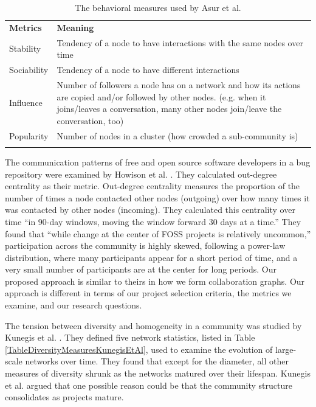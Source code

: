 \documentclass{acm_proc_article-sp}
\begin{document}
\begin{table}[!htbp]
\caption{The behavioral measures used by Asur et al. \cite{Asur}}
\label{tableDiversityMeasuresAsurEtAl} 
\begin{tabular}{p{} p{}}
\hline\noalign{\smallskip}
\textbf{Metrics} & \textbf{Meaning} \\
\noalign{\smallskip}\hline\noalign{\smallskip}
Stability & Tendency of a node to have interactions with the same nodes over time \\ \hline
Sociability & Tendency of a node to have different interactions \\\hline
Influence & Number of followers a node has on a network and how its actions are copied and/or followed by other nodes. (e.g. when it joins/leaves a conversation, many other nodes join/leave the conversation, too) \\\hline
Popularity & Number of nodes in a cluster (how crowded a sub-community is) \\
\noalign{\smallskip}\hline
\end{tabular}
\end{table}

The communication patterns of free and open source software developers in a bug repository were examined by Howison et al. \cite{HowisonSocialDynamics}. They calculated out-degree centrality as their metric. Out-degree centrality measures the proportion of the number of times a node contacted other nodes (outgoing) over how many times it was contacted by other nodes (incoming). They calculated this centrality over time ``in 90-day windows, moving the window forward 30 days at a time.'' They found that ``while change at the center of FOSS projects is relatively uncommon,'' participation across the community is highly skewed, following a power-law distribution, where many participants appear for a short period of time, and a very small number of participants are at the center for long periods. Our proposed approach is similar to theirs in how we form collaboration graphs. Our approach is different in terms of our project selection criteria, the metrics we examine, and our research questions.

The tension between diversity and homogeneity in a community was studied by Kunegis et al. \cite{Kunegis}. They defined five network statistics, listed in Table \ref{TableDiversityMeasuresKunegisEtAl}, used to examine the evolution of large-scale networks over time. They found that except for the diameter, all other measures of diversity shrunk as the networks matured over their lifespan. Kunegis et al. \cite{Kunegis} argued that one possible reason could be that the community structure consolidates as projects mature.
\end{document}
